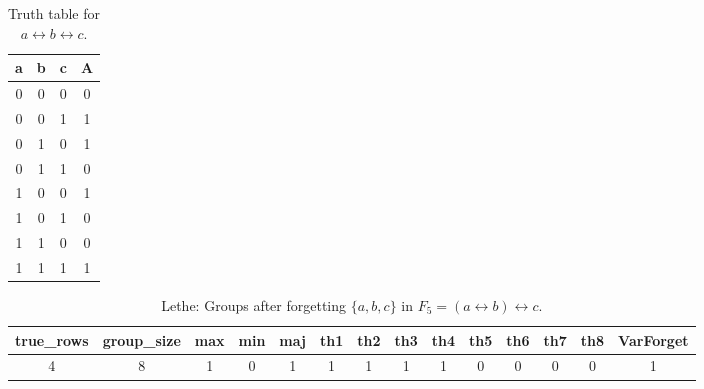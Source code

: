 \begin{table}[!tb]
    \centering
    \begin{tabular}{|c|c|c|c|}
        \hline
        \textbf{a} & \textbf{b} & \textbf{c} & \textbf{A} \\ \hline
        0 & 0 & 0 & 0 \\ \hline
        0 & 0 & 1 & 1 \\ \hline
        0 & 1 & 0 & 1 \\ \hline
        0 & 1 & 1 & 0 \\ \hline
        1 & 0 & 0 & 1 \\ \hline
        1 & 0 & 1 & 0 \\ \hline
        1 & 1 & 0 & 0 \\ \hline
        1 & 1 & 1 & 1 \\ \hline
    \end{tabular}
    \caption{Truth table for $a \leftrightarrow b \leftrightarrow c$.}
    \label{tab:truthtab}
\end{table}

\begin{table}[!tb]
    \centering
    \begin{tabular}{|c|c|c|c|c|c|c|c|c|c|c|c|c|c|}
        \hline
        \textbf{true\_rows} & \textbf{group\_size} & \textbf{max} & \textbf{min} & \textbf{maj} & \textbf{th1} & \textbf{th2} & \textbf{th3} & \textbf{th4} & \textbf{th5} & \textbf{th6} & \textbf{th7} & \textbf{th8} & \textbf{VarForget} \\ \hline
        \rowcolor{gray!40} 4 & 8 & 1 & 0 & 1 & 1 & 1 & 1 & 1 & 0 & 0 & 0 & 0 & 1 \\ \hline
    \end{tabular}
    \caption{Lethe: Groups after forgetting $\{a, b, c\}$ in $F_{5} = (a \leftrightarrow b) \leftrightarrow c$.}
    \label{tab:lethe-F5-abc-groups}
\end{table}

